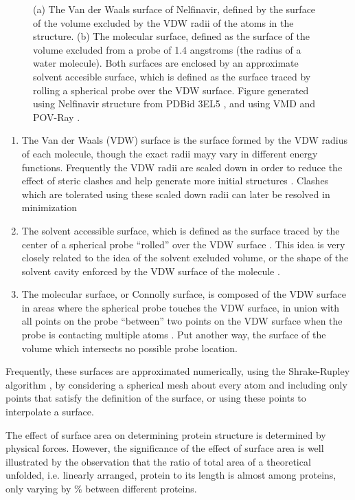 \begin{figure}[h!]
\begin{subfigure}[b]{0.4\textwidth}
\caption{}
\label{figure:molecular_surface}
\end{subfigure}
\caption{(a) The Van der Waals surface of Nelfinavir, defined by the surface of the volume excluded by the VDW radii of the atoms in the structure.
(b) The molecular surface, defined as the surface of the volume excluded from a probe of 1.4 angstroms (the radius of a water molecule).
Both surfaces are enclosed by an approximate solvent accesible surface, which is defined as the surface traced by rolling a spherical probe over the VDW surface.
Figure generated using Nelfinavir structure from PDBid 3EL5 \protect\cite{king2012extreme}, and using VMD and POV-Ray \protect\cite{humphrey1996vmd,povray}.}
\label{figure:surfaces}
\end{figure}
\begin{enumerate}
\item The Van der Waals (VDW) surface is the surface formed by the VDW radius of each molecule, though the exact radii mayy vary in different energy functions.
Frequently the VDW radii are scaled down in order to reduce the effect of steric clashes and help generate more initial structures \cite{schulz2003binding,halgren2004glide}.
Clashes which are tolerated using these scaled down radii can later be resolved in minimization
\item The solvent accessible surface, which is defined as the surface traced by the center of a spherical probe ``rolled'' over the VDW surface \cite{richards1977areas}.
This idea is very closely related to the idea of the solvent excluded volume, or the shape of the solvent cavity enforced by the VDW surface of the molecule \cite{richmond1984solvent}.
\item The molecular surface, or Connolly surface, is composed of the VDW surface in areas where the spherical probe touches the VDW surface, in union with all points on the probe ``between'' two points on the VDW surface when the probe is contacting multiple atoms \cite{connolly1983analytical}.
Put another way, the surface of the volume which intersects no possible probe location.
\end{enumerate}
Frequently, these surfaces are approximated numerically, using the Shrake-Rupley algorithm \cite{shrake1973environment}, by considering a spherical mesh about every atom and including only points that satisfy the definition of the surface, or using these points to interpolate a surface.

The effect of surface area on determining protein structure is determined by physical forces.
However, the significance of the effect of surface area is well illustrated by the observation that the ratio of total area of a theoretical unfolded, i.e. linearly arranged, protein to its length is almost among proteins, only varying by \% between different proteins.
